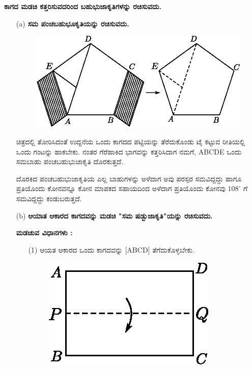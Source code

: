 \noindent
\textbf{ಕಾಗದ ಮಡಚಿ ಕತ್ತರಿಸುವದರಿಂದ ಬಹುಭುಜಾಕೃತಿಗಳನ್ನು ರಚಿಸುವದು.}
\begin{itemize}
\item[(a)] \textbf{ಸಮ ಪಂಚಬಹುಭೂಕೃತಿಯನ್ನು ರಚಿಸುವದು.}
\begin{figure}[H]
\centering
\includegraphics[scale=.8]{src/figure/chap1/fig1-16a.eps}
\end{figure}

ಚಿತ್ರದಲ್ಲಿ ತೋರಿಸಿದಂತೆ ಉದ್ದನೆಯ ಒಂದು ಕಾಗದದ ಪಟ್ಟಿಯನ್ನು ತೆರೆದುಕೊಂಡು ಟೈ ಕಟ್ಟುವ ರೀತಿಯಲ್ಲಿ ಒಂದು ಗಂಟನ್ನು ಹಾಕಬೇಕು. ನಂತರ ಗೆರೆಹಾಕಿದ ಭಾಗವನ್ನು ಕತ್ತರಿಸಿದಾಗ ನಮಗೆ,  ABCDE ಒಂದು ಸಮಬಾಹು ಪಂಚಬಹುಭುಜಾಕೃತಿ ದೊರಕುತ್ತದೆ. 

\eject

ದೊರಕಿದ ಪಂಚಬಹುಭುಜಾಕೃತಿಯ ಎಲ್ಲ ಬಾಹುಗಳನ್ನು ಅಳೆದಾಗ ಅವು ಪರಸ್ಪರ ಸಮವಿದ್ದದ್ದು ಹಾಗೂ ಪ್ರತಿಯೊಂದು ಕೋನವನ್ನೂ ಕೋನ ಮಾಪಕದ ಸಹಾಯದಿಂದ ಅಳೆದಾಗ ಪ್ರತಿಯೊಂದು ಕೋನವು $108^\circ$ ಗೆ ಸಮವಿದ್ದದ್ದು ಕಂಡುಬರುತ್ತದೆ. 


\item[(b)] \textbf{ಆಯಾತ ಆಕಾರದ ಕಾಗದವನ್ನು ಮಡಚಿ "ಸಮ ಷಡ್ಬುಜಾಕೃತಿ"ಯನ್ನು ರಚಿಸುವದು.}

\noindent
\textbf{ಮಡಚುವ ವಿಧಾನಗಳು : }
\begin{enumerate}
\item[(1)] ಆಯತ ಆಕಾರದ ಒಂದು ಕಾಗದವನ್ನು [ABCD] ತೆಗೆದುಕೊಳ್ಳಬೇಕು.
\begin{figure}[H]
\centering
\includegraphics[scale=.98]{src/figure/chap1/fig1-16b1.eps}
\end{figure}


\end{enumerate}
\end{itemize}
